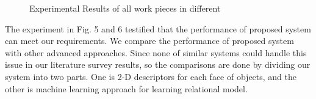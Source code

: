 \documentclass[journal]{IEEEtran}
\begin{document}
\begin{figure}[!t]
\centering


\caption{Experimental Results of all work pieces in different }

\end{figure}

The experiment in Fig. 5 and 6 testified that the performance of proposed system can meet our requirements. We compare the performance of proposed system with other advanced approaches. Since none of similar systems could handle this issue in our literature survey results, so the comparisons are done by dividing our system into two parts. One is 2-D descriptors for each face of objects, and the other is machine learning approach for learning relational model.
\end{document}
